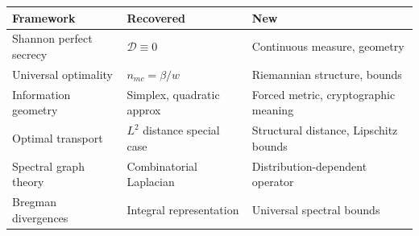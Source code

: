 \begin{center}
\begin{tabular}{lll}
\hline
\textbf{Framework} & \textbf{Recovered} & \textbf{New} \\
\hline
Shannon perfect secrecy & $\mathcal D\equiv0$ & Continuous measure, geometry \\
Universal optimality & $n_{mc}=\beta/w$ & Riemannian structure, bounds \\
Information geometry & Simplex, quadratic approx & Forced metric, cryptographic meaning \\
Optimal transport & $L^2$ distance special case & Structural distance, Lipschitz bounds \\
Spectral graph theory & Combinatorial Laplacian & Distribution-dependent operator \\
Bregman divergences & Integral representation & Universal spectral bounds \\
\hline
\end{tabular}
\end{center}
